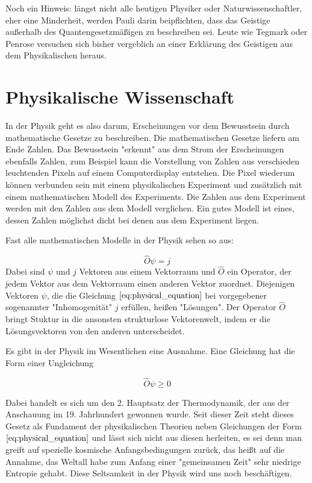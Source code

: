 \documentclass[12pt]{book}
\begin{document}
Noch ein Hinweis: längst nicht alle heutigen Physiker oder Naturwissenschaftler, eher eine Minderheit, werden Pauli darin beipflichten, dass das Geistige außerhalb des Quantengesetzmäßigen zu beschreiben sei. Leute wie Tegmark oder Penrose versuchen sich bisher vergeblich an einer Erklärung des Geistigen aus dem Physikalischen heraus.

\section{Physikalische Wissenschaft}

In der Physik geht es also darum, Erscheinungen vor dem Bewusstsein durch mathematische Gesetze zu beschreiben. Die mathematischen Gesetze liefern am Ende Zahlen. Das Bewusstsein "erkennt" aus dem Strom der Erscheinungen ebenfalls Zahlen, zum Beispiel kann die Vorstellung von Zahlen aus verschieden leuchtenden Pixeln auf einem Computerdisplay entstehen. Die Pixel wiederum können verbunden sein mit einem physikalischen Experiment und zusätzlich mit einem mathematischen Modell des Experiments. Die Zahlen aus dem Experiment werden mit den Zahlen aus dem Modell verglichen. Ein gutes Modell ist eines, dessen Zahlen möglichst dicht bei denen aus dem Experiment liegen.

Fast alle mathematischen Modelle in der Physik sehen so aus:

\begin{equation} 
\hat{O}\psi = j
\label{eq:physical_equation}
\end{equation}
Dabei sind $\psi$ und $j$ Vektoren aus einem Vektorraum und $\hat{O}$ ein Operator, der jedem Vektor aus dem Vektorraum einen anderen Vektor zuordnet. Diejenigen Vektoren $\psi$, die die Gleichung $\eqref{eq:physical_equation}$ bei vorgegebener sogenannter "Inhomogenität" $j$ erfüllen, heißen "Lösungen". Der Operator $\hat{O}$ bringt Stuktur in die ansonsten strukturlose Vektorenwelt, indem er die Lösungsvektoren von den anderen unterscheidet.

Es gibt in der Physik im Wesentlichen eine Ausnahme. Eine Gleichung hat die Form einer Ungleichung

\begin{equation} 
\hat{O}\psi \geq 0
\label{eq:physical_inequality}
\end{equation}

Dabei handelt es sich um den 2. Hauptsatz der Thermodynamik, der aus der Anschauung im 19. Jahrhundert gewonnen wurde. Seit dieser Zeit steht dieses Gesetz als Fundament der physikalischen Theorien neben Gleichungen der Form $\eqref{eq:physical_equation}$ und lässt sich nicht aus diesen herleiten, es sei denn man greift auf spezielle kosmische Anfangsbedingungen zurück, das heißt auf die Annahme, das Weltall habe zum Anfang einer "gemeinsamen Zeit" sehr niedrige Entropie gehabt. Diese Seltsamkeit in der Physik wird uns noch beschäftigen.
\end{document}
